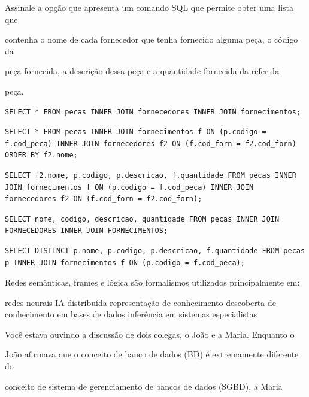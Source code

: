 \documentclass[12pt, addpoints]{exam}
\begin{document}
\begin{questions}
Assinale a opção que apresenta um comando SQL que permite obter uma lista que

contenha o nome de cada fornecedor que tenha fornecido alguma peça, o código da

peça fornecida, a descrição dessa peça e a quantidade fornecida da referida

peça.
\begin{choices}
\choice \begin{verbatim}SELECT * FROM pecas INNER JOIN fornecedores INNER JOIN fornecimentos;\end{verbatim} 
\choice \begin{verbatim}SELECT * FROM pecas INNER JOIN fornecimentos f ON (p.codigo = f.cod_peca) INNER JOIN fornecedores f2 ON (f.cod_forn = f2.cod_forn) ORDER BY f2.nome;\end{verbatim} 
\choice \begin{verbatim}SELECT f2.nome, p.codigo, p.descricao, f.quantidade FROM pecas INNER JOIN fornecimentos f ON (p.codigo = f.cod_peca) INNER JOIN fornecedores f2 ON (f.cod_forn = f2.cod_forn);\end{verbatim} 
\choice \begin{verbatim}SELECT nome, codigo, descricao, quantidade FROM pecas INNER JOIN FORNECEDORES INNER JOIN FORNECIMENTOS;\end{verbatim} 
\choice \begin{verbatim}SELECT DISTINCT p.nome, p.codigo, p.descricao, f.quantidade FROM pecas p INNER JOIN fornecimentos f ON (p.codigo = f.cod_peca);\end{verbatim} 
\end{choices}

\question

Redes semânticas, frames e lógica são formalismos utilizados principalmente em: 
\begin{choices}
\choice redes neurais
\choice IA distribuída
\choice representação de conhecimento
\choice descoberta de conhecimento em bases de dados
\choice inferência em sistemas especialistas
\end{choices}

\question

Você estava ouvindo a discussão de dois colegas, o João e a Maria. Enquanto o

João afirmava que o conceito de banco de dados (BD) é extremamente diferente do

conceito de sistema de gerenciamento de bancos de dados (SGBD), a Maria


\end{questions}
\end{document}
